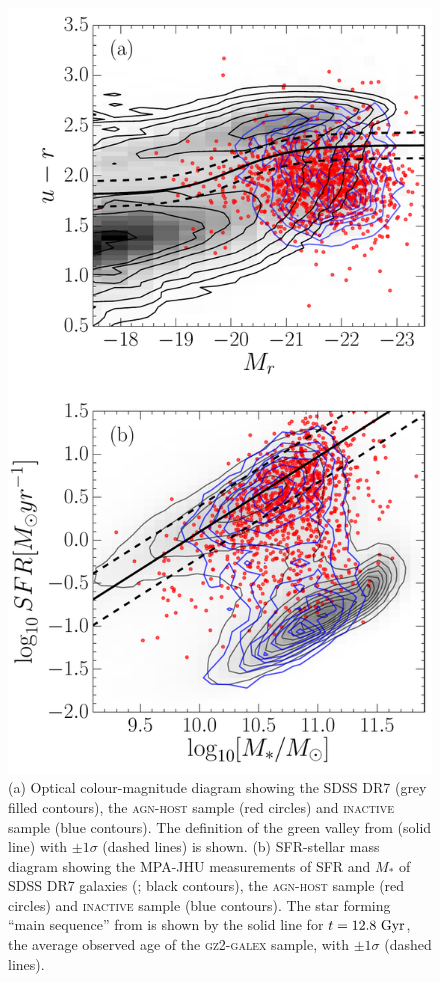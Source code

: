 \begin{figure}
\centering
\includegraphics[height=0.75\textheight]{agn/fig3.pdf}
\caption[Colour-magnitude and SFR-mass diagram for \textsc{agn-host} galaxies]{(a) Optical colour-magnitude diagram showing the SDSS DR7 (grey filled contours), the \textsc{agn-host} sample (red circles) and \textsc{inactive} sample (blue contours). The definition of the green valley from \citet{Baldry06} (solid line) with $\pm 1\sigma$ (dashed lines) is shown. (b) SFR-stellar mass diagram showing the MPA-JHU measurements of SFR and $M_*$ of SDSS DR7 galaxies (\citealt{kauffmann03, brinchmann04}; black contours), the \textsc{agn-host} sample (red circles) and \textsc{inactive} sample (blue contours). The star forming ``main sequence'' from \citet{peng10} is shown by the solid line for $t = 12.8~\rm{Gyr}$, the average observed age of the \textsc{gz2-galex} sample, with $\pm1\sigma$ (dashed lines).}
\label{cmdsfms}
\end{figure}

